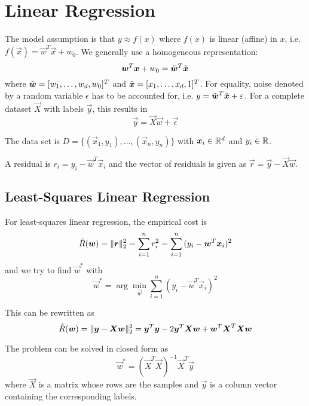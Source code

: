 \section{Linear Regression}
The model assumption is that $y \approx f(x)$ where $f(x)$ is
linear (affine) in $x$,
i.e. $f(\vec{x}) = \vec{w}^T \vec{x} + w_0$.
We generally use a homogeneous representation:
\begin{equation*}
    \vec{w}^T \vec{x} + w_0 = \Tilde{\vec{w}}^T \Tilde{\vec{x}}
\end{equation*}
where $\Tilde{\vec{w}} = [w_1, \dotsc, w_d, w_0]^T$ and
$\Tilde{\vec{x}} = [x_1, \dotsc, x_d, 1]^T$.
For equality, noise denoted by a random variable $\epsilon$
has to be accounted for, i.e.
$y = \Tilde{\vec{w}}^T \Tilde{\vec{x}} + \epsilon$.
For a complete dataset $\vec{X}$ with labels $\vec{y}$,
this results in
\begin{equation*}
    \vec{y} = \vec{X} \vec{w} + \vec{\epsilon}
\end{equation*}

The data set is $D = \{(\vec{x}_1, y_1), \dotsc, (\vec{x}_n, y_n)\}$
with $\vec{x}_i \in \R^d$ and $y_i \in \R$.

A residual is $r_i = y_i - \vec{w}^T \vec{x}_i$ and the
vector of residuals is given as
$\vec{r} = \vec{y} - \vec{X}\vec{w}$.

\subsection{Least-Squares Linear Regression}
For least-squares linear regression, the empirical cost is
\begin{equation*}
    \hat{R}(\vec{w}) = \norm{\vec{r}}_2^2
    = \sum_{i = 1}^n{r_i^2}
    = \sum_{i = 1}^n{(y_i - \vec{w}^T \vec{x}_i)^2}
\end{equation*}
and we try to find $\vec{w}^*$ with
\begin{equation*}
    \vec{w}^* = \arg\min_{\vec{w}}{
        \sum_{i = 1}^n{(y_i - \vec{w}^T \vec{x}_i)^2}
    }
\end{equation*}

This can be rewritten as
\begin{equation*}
    \hat{R}(\vec{w})
    = \norm{\vec{y} - \vec{X}\vec{w}}_2^2
    = \vec{y}^T \vec{y} - 2 \vec{y}^T \vec{X} \vec{w} + \vec{w}^T \vec{X}^T \vec{X} \vec{w}
\end{equation*}

The problem can be solved in closed form as
\begin{equation*}
    \vec{w}^* = (\vec{X}^T \vec{X})^{-1} \vec{X}^T \vec{y}
\end{equation*}
where $\vec{X}$ is a matrix whose rows are the samples and
$\vec{y}$ is a column vector containing the corresponding labels.

